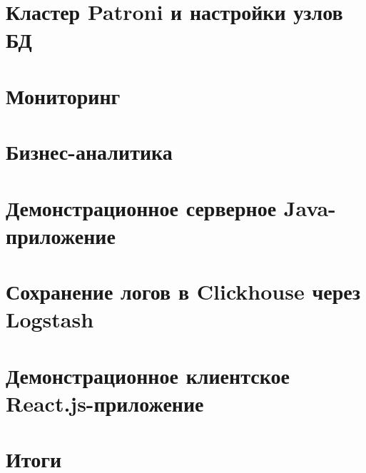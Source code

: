 \documentclass[a4paper,12pt]{article}
\begin{document}
    \section{Кластер Patroni и настройки узлов БД}\label{sec:patronicluster}
    

    \section{Мониторинг}\label{sec:monitoring}
    

    \section{Бизнес-аналитика}\label{sec:businessintelligence}
    

    \section{Демонстрационное серверное Java-приложение}\label{sec:javaapp}
    

    \section{Сохранение логов в Clickhouse через Logstash}\label{sec:logstashclickhouse}
    

    \section{Демонстрационное клиентское React.js-приложение}\label{sec:reactapp}
    

    \section{Итоги}\label{sec:results}
    
\end{document}
